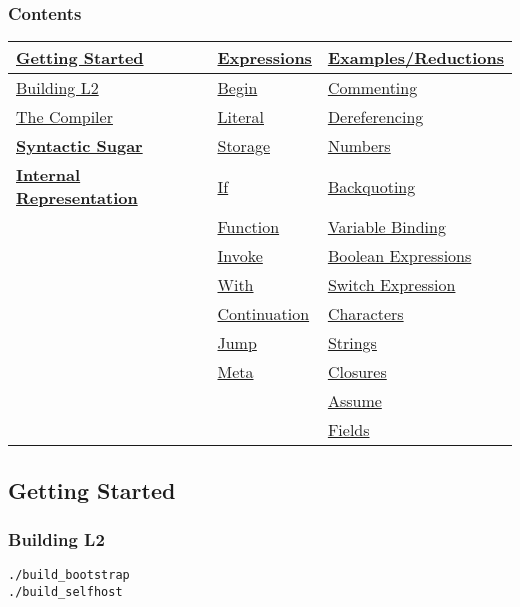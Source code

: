 \documentclass[]{article}
\begin{document}
\subsubsection{Contents}\label{contents}

\begin{longtable}[]{@{}lll@{}}
\toprule
\textbf{\protect\hyperlink{getting-started}{Getting Started}} &
\protect\hyperlink{expressions}{Expressions} &
\protect\hyperlink{examplesreductions}{Examples/Reductions}\tabularnewline
\midrule
\endhead
\protect\hyperlink{building-l2}{Building L2} &
\protect\hyperlink{begin}{Begin} &
\protect\hyperlink{commenting}{Commenting}\tabularnewline
\protect\hyperlink{the-compiler}{The Compiler} &
\protect\hyperlink{literal}{Literal} &
\protect\hyperlink{dereferencing}{Dereferencing}\tabularnewline
\textbf{\protect\hyperlink{syntactic-sugar}{Syntactic Sugar}} &
\protect\hyperlink{storage}{Storage} &
\protect\hyperlink{numbers}{Numbers}\tabularnewline
\textbf{\protect\hyperlink{internal-representation}{Internal
Representation}} & \protect\hyperlink{if}{If} &
\protect\hyperlink{backquoting}{Backquoting}\tabularnewline
& \protect\hyperlink{function}{Function} &
\protect\hyperlink{variable-binding}{Variable Binding}\tabularnewline
& \protect\hyperlink{invoke}{Invoke} &
\protect\hyperlink{boolean-expressions}{Boolean
Expressions}\tabularnewline
& \protect\hyperlink{with}{With} &
\protect\hyperlink{switch-expression}{Switch Expression}\tabularnewline
& \protect\hyperlink{continuation}{Continuation} &
\protect\hyperlink{characters}{Characters}\tabularnewline
& \protect\hyperlink{jump}{Jump} &
\protect\hyperlink{strings}{Strings}\tabularnewline
& \protect\hyperlink{meta}{Meta} &
\protect\hyperlink{closures}{Closures}\tabularnewline
& & \protect\hyperlink{assume}{Assume}\tabularnewline
& & \protect\hyperlink{fields}{Fields}\tabularnewline
\bottomrule
\end{longtable}

\hypertarget{getting-started}{\subsection{Getting
Started}\label{getting-started}}

\hypertarget{building-l2}{\subsubsection{Building
L2}\label{building-l2}}

\begin{verbatim}
./build_bootstrap
./build_selfhost
\end{verbatim}
\end{document}
